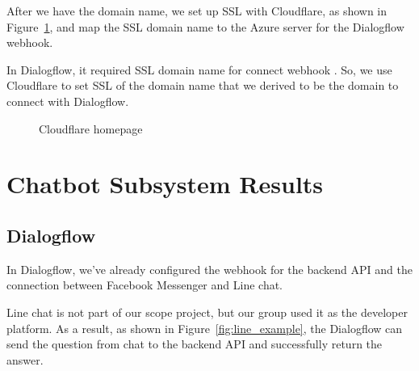 \documentclass[12pt,oneside,openright,a4paper]{cpe-english-project}
\begin{document}
After we have the domain name, we set up SSL with Cloudflare,
as shown in Figure~\ref*{fig:Cloudflare homepage},
and map the SSL domain name to the Azure server for the Dialogflow webhook.

In Dialogflow, it required SSL domain name for connect webhook \cite{dialogflow_webhook_requirement}.
So, we use Cloudflare to set SSL of the domain name that we derived
to be the domain to connect with Dialogflow.

\begin{figure}[!h]\centering
	\caption{Cloudflare homepage}\label{fig:Cloudflare homepage}
\end{figure}

\pagebreak
\section{Chatbot Subsystem Results}
\subsection{Dialogflow}
In Dialogflow, we've already configured the webhook for the backend API
and the connection between Facebook Messenger and Line chat.

Line chat is not part of our scope project,
but our group used it as the developer platform.
As a result, as shown in Figure~\ref*{fig:line_example},
the Dialogflow can send the question from chat to the backend API and successfully return the answer.
\end{document}
